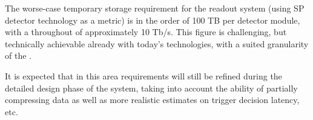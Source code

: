 The worse-case temporary storage requirement for the readout system (using SP detector technology as a metric) is in the order of 100 TB per  detector module, with a throughout of approximately 10 Tb/s.
This figure is challenging, but technically achievable already with today's technologies, with a suited granularity of the . 

It is expected that in this area requirements will still be refined during the detailed design phase of the  system, taking into account the ability of partially compressing data as well as more realistic estimates on trigger decision latency, etc.







